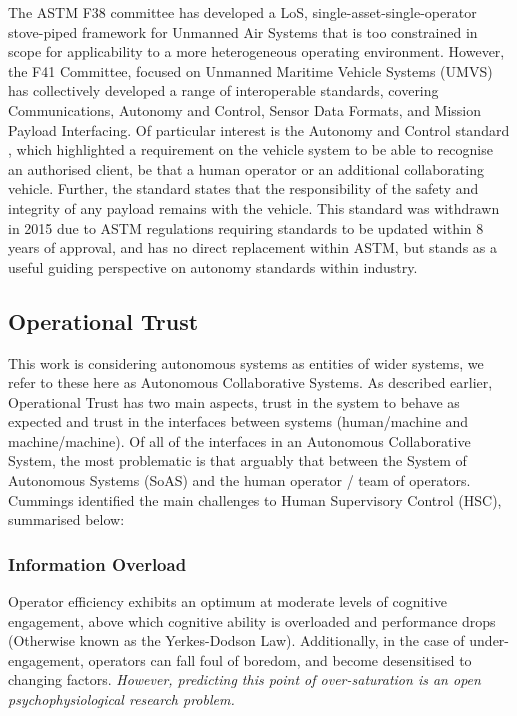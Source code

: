 The ASTM F38 committee has developed a LoS, single-asset-single-operator stove-piped framework for Unmanned Air Systems that is too constrained in scope for applicability to a more heterogeneous operating environment\cite{AmericanSocietyofTestingandMaterials2007}.
 However, the F41 Committee, focused on Unmanned Maritime Vehicle Systems (UMVS) has collectively developed a range of interoperable standards, covering Communications, Autonomy and Control, Sensor Data Formats, and Mission Payload Interfacing.
 Of particular interest is the Autonomy and Control standard \cite{AmericanSocietyofTestingandMaterials2006}, which highlighted a requirement on the vehicle system to be able to recognise an authorised client, be that a human operator or an additional collaborating vehicle.
 Further, the standard states that the responsibility of the safety and integrity of any payload remains with the vehicle.
 This standard was withdrawn in 2015 due to ASTM regulations requiring standards to be updated within 8 years of approval, and has no direct replacement within ASTM, but stands as a useful guiding perspective on autonomy standards within industry.
 
 
 \subsection{Operational Trust}
 
 This work is considering autonomous systems as entities of wider systems, we refer to these here as Autonomous Collaborative Systems.
 As described earlier, Operational Trust has two main aspects, trust in the system to behave as expected and trust in the interfaces between systems (human/machine and machine/machine).
 Of all of the interfaces in an Autonomous Collaborative System, the most problematic is that arguably that between the System of Autonomous Systems (SoAS) and the human operator / team of operators.
 Cummings identified the main challenges to Human Supervisory Control (HSC), summarised below:\cite{Cummings2010}

 \subsubsection{Information Overload}
 Operator efficiency exhibits an optimum at moderate levels of cognitive engagement, above which cognitive ability is overloaded and performance drops (Otherwise known as the Yerkes-Dodson Law).
 Additionally, in the case of under-engagement, operators can fall foul of boredom, and become desensitised to changing factors.
 \textit{However, predicting this point of over-saturation is an open psychophysiological research problem.}

